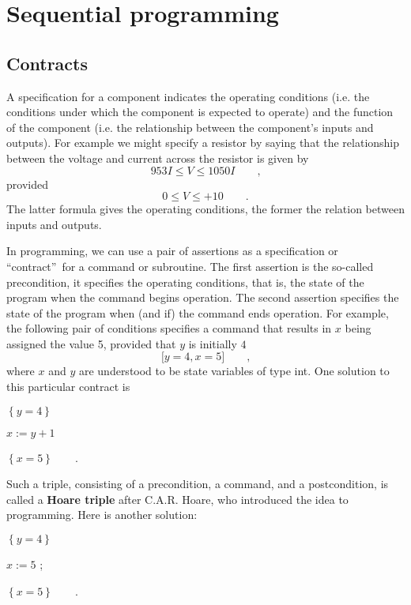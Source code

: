 \documentclass[11pt]{article}%
\begin{document}
\section{Sequential programming\label{seq}}

\subsection{Contracts}

A specification for a component indicates the operating conditions (i.e. the
conditions under which the component is expected to operate) and the function
of the component (i.e. the relationship between the component's inputs and
outputs). For example we might specify a resistor by saying that the
relationship between the voltage and current across the resistor is given by%
\[
953I\leq V\leq1050I\qquad\text{,}%
\]
provided%
\[
0\leq V\leq+10\qquad\text{.}%
\]
The latter formula gives the operating conditions, the former the relation
between inputs and outputs.

In programming, we can use a pair of assertions as a specification or
\textquotedblleft contract\textquotedblright\ for a command or subroutine. The
first assertion is the so-called precondition, it specifies the operating
conditions, that is, the state of the program when the command begins
operation. The second assertion specifies the state of the program when (and
if) the command ends operation. For example, the following pair of conditions
specifies a command that results in $x$ being assigned the value 5, provided
that $y$ is initially $4$%
\[
\lbrack y=4,x=5]\qquad\text{,}%
\]
where $x$ and $y$ are understood to be state variables of type \textsf{int}.
One solution to this particular contract is

\begin{code}
$\left\{  y=4\right\}  $

$x:=y+1$

$\left\{  x=5\right\}  \qquad$.
\end{code}

\noindent Such a triple, consisting of a precondition, a command, and a
postcondition, is called a \textbf{Hoare triple} after C.A.R. Hoare, who
introduced the idea to programming. Here is another solution:

\begin{code}
$\left\{  y=4\right\}  $

$x:=5$ ;

$\left\{  x=5\right\}  \qquad$.
\end{code}
\end{document}
